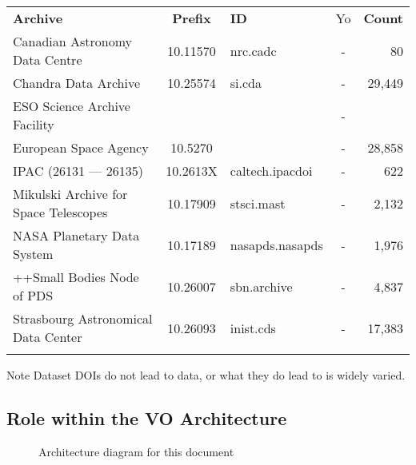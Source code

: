 \documentclass[11pt,a4paper]{ivoa}
\begin{document}
\begin{table}[th]
\begin{tabular}{lclcr}
\sptablerule
\textbf{Archive} & \textbf{Prefix} & \textbf{ID} & Yo & \textbf{Count} \\
\sptablerule
Canadian Astronomy Data Centre        & 10.11570 & nrc.cadc        & - &     80   \\
Chandra Data Archive                  & 10.25574 & si.cda          & - & 29,449   \\
ESO Science Archive Facility          &          &                 & - &          \\
European Space Agency                 & 10.5270  &                 & - & 28,858   \\
IPAC (26131 --- 26135)                & 10.2613X & caltech.ipacdoi & - &    622   \\
Mikulski Archive for Space Telescopes & 10.17909 & stsci.mast      & - &  2,132   \\
NASA Planetary Data System            & 10.17189 & nasapds.nasapds & - &  1,976   \\
++Small Bodies Node of PDS            & 10.26007 & sbn.archive     & - &  4,837   \\
Strasbourg Astronomical Data Center   & 10.26093 & inist.cds       & - & 17,383   \\
\sptablerule
\end{tabular}%
\caption{\label{tab:astroDOIs1}}
\end{table}


\begin{admonition}{Note}
Dataset DOIs do not lead to data, or what they do lead to is widely varied.
\end{admonition}


\subsection{Role within the VO Architecture}

\begin{figure}
\centering

\caption{Architecture diagram for this document}
\label{fig:archdiag}
\end{figure}
\end{document}
